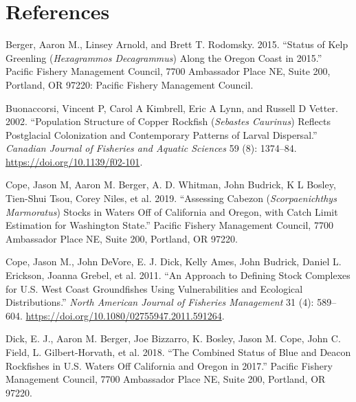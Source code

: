 \documentclass[11pt,
  english,
  a4paper,
]{article}
\begin{document}
\leavevmode\tagmcend\tagstructend\par

\clearpage


\hypertarget{references}{%
\section{References}\label{references}}

\leavevmode\tagmcend\tagstructend


\hypertarget{refs}{}
\leavevmode\hypertarget{ref-berger_kelpgreenling_2015}{}%
Berger, Aaron M., Linsey Arnold, and Brett T. Rodomsky. 2015. ``Status of Kelp Greenling (\emph{Hexagrammos Decagrammus}) Along the Oregon Coast in 2015.'' Pacific Fishery Management Council, 7700 Ambassador Place NE, Suite 200, Portland, OR 97220: Pacific Fishery Management Council.

\leavevmode\hypertarget{ref-buonaccorsi_population_2002}{}%
Buonaccorsi, Vincent P, Carol A Kimbrell, Eric A Lynn, and Russell D Vetter. 2002. ``Population Structure of Copper Rockfish (\emph{Sebastes Caurinus}) Reflects Postglacial Colonization and Contemporary Patterns of Larval Dispersal.'' \emph{Canadian Journal of Fisheries and Aquatic Sciences} 59 (8): 1374--84. \url{https://doi.org/10.1139/f02-101}.

\leavevmode\hypertarget{ref-cope_cabezon_2019}{}%
Cope, Jason M, Aaron M. Berger, A. D. Whitman, John Budrick, K L Bosley, Tien-Shui Tsou, Corey Niles, et al. 2019. ``Assessing Cabezon (\emph{Scorpaenichthys Marmoratus}) Stocks in Waters Off of California and Oregon, with Catch Limit Estimation for Washington State.'' Pacific Fishery Management Council, 7700 Ambassador Place NE, Suite 200, Portland, OR 97220.

\leavevmode\hypertarget{ref-cope_approach_2011}{}%
Cope, Jason M., John DeVore, E. J. Dick, Kelly Ames, John Budrick, Daniel L. Erickson, Joanna Grebel, et al. 2011. ``An Approach to Defining Stock Complexes for U.S. West Coast Groundfishes Using Vulnerabilities and Ecological Distributions.'' \emph{North American Journal of Fisheries Management} 31 (4): 589--604. \url{https://doi.org/10.1080/02755947.2011.591264}.

\leavevmode\hypertarget{ref-dick_bluedeacon_2018}{}%
Dick, E. J., Aaron M. Berger, Joe Bizzarro, K. Bosley, Jason M. Cope, John C. Field, L. Gilbert-Horvath, et al. 2018. ``The Combined Status of Blue and Deacon Rockfishes in U.S. Waters Off California and Oregon in 2017.'' Pacific Fishery Management Council, 7700 Ambassador Place NE, Suite 200, Portland, OR 97220.
\end{document}
